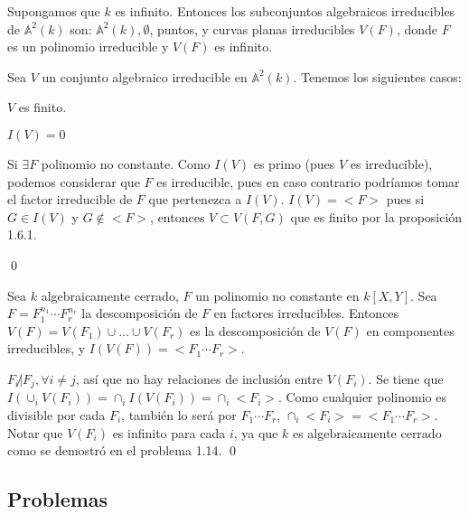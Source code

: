\begin{Cor}
Supongamos que $k$ es infinito. Entonces los subconjuntos algebraicos irreducibles de $\mathbb{A}^2(k)$ son: $\mathbb{A}^2(k),\emptyset$, puntos, y curvas planas irreducibles $V(F)$, donde $F$ es un polinomio irreducible y $V(F)$ es infinito.
\end{Cor}

\begin{Dem}
  Sea $V$ un conjunto algebraico irreducible en $\mathbb{A}^2(k)$. Tenemos los siguientes casos:
  \begin{itemize*}
  \item $V$ es finito.
  \item $I(V)= 0$
  \item Si $\exists F$ polinomio no constante. Como $I(V)$ es primo (pues $V$ es irreducible), podemos considerar que $F$ es irreducible, pues en caso contrario podríamos tomar el factor irreducible de $F$ que pertenezca a $I(V)$. $I(V)=<F>$ pues si $G\in I(V)$ y $G\notin <F>$, entonces $V\subset V(F,G)$ que es finito por la proposición 1.6.1.
  \end{itemize*}
\qed
\end{Dem}

\begin{Cor}
Sea $k$ algebraicamente cerrado, $F$ un polinomio no constante en $k[X,Y]$. Sea $F=F_1^{n_1}\cdots F_r^{n_r}$ la descomposición de $F$ en factores irreducibles. Entonces $V(F)=V(F_1)\cup \dots \cup V(F_r)$ es la descomposición de $V(F)$ en componentes irreducibles, y $I(V(F))=<F_1\cdots F_r>$.
\end{Cor}

\begin{Dem}
 $F_i\not| F_j, \forall i\neq j$, así que no hay relaciones de inclusión entre $V(F_i)$. Se tiene que $I(\cup_i V(F_i))=\cap_iI(V(F_i))=\cap_i<F_i>$. Como cualquier polinomio es divisible por cada $F_i$, también lo será por $F_1\cdots F_r$, $\cap_i<F_i>=<F_1\cdots F_r>$. Notar que $V(F_i)$ es infinito para cada $i$, ya que $k$ es algebraicamente cerrado como se demostró en el problema 1.14. \qed
\end{Dem}

\subsection{Problemas}

